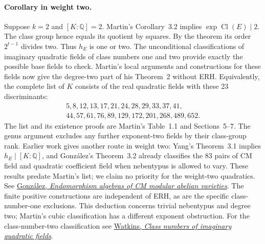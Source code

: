 \paragraph{Corollary in weight two.}
Suppose $k=2$ and $[K:\mathbb Q]=2$. Martin's Corollary~3.2 implies $\exp\operatorname{Cl}(E)\mid 2$. The class group hence equals its quotient by squares. By the theorem its order $2^{t-1}$ divides two. Thus $h_E$ is one or two. The unconditional classifications of imaginary quadratic fields of class numbers one and two provide exactly the possible base fields to check. Martin's local arguments and constructions for these fields now give the degree-two part of his Theorem~2 without ERH. Equivalently, the complete list of $K$ consists of the real quadratic fields with these 23 discriminants:
\[
\begin{gathered}
 5,8,12,13,17,21,24,28,29,33,37,41,\qquad\\[-2pt]
 44,57,61,76,89,129,172,201,268,489,652 .
\end{gathered}
\]
The list and its existence proofs are Martin's Table~1.1 and Sections~5--7. The genus argument excludes any further exponent-two fields by their class-group rank. Earlier work gives another route in weight two: Yang's Theorem~3.1 implies $h_E\mid[K:\mathbb Q]$, and Gonz\'alez's Theorem~3.2 already classifies the 83 pairs of CM field and quadratic coefficient field when nebentypus is allowed to vary. These results predate Martin's list; we claim no priority for the weight-two quadratics. See \href{https://ems.press/content/serial-article-files/38349}{Gonz\'alez, \emph{Endomorphism algebras of CM modular abelian varieties}}. The finite positive constructions are independent of ERH, as are the specific class-number-one exclusions. This deduction concerns trivial nebentypus and degree two; Martin's cubic classification has a different exponent obstruction. For the class-number-two classification see \href{https://magma.maths.usyd.edu.au/~watkins/papers/smallcn.pdf}{Watkins, \emph{Class numbers of imaginary quadratic fields}}.

